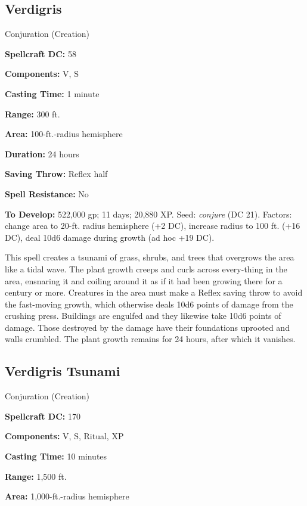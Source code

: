 \documentclass{article}
\begin{document}
\vspace{12pt}
\subsection*{Verdigris }

Conjuration (Creation) 

\textbf{Spellcraft DC:} 58 

\textbf{Components:} V, S 

\textbf{Casting Time:} 1 minute 

\textbf{Range:} 300 ft. 

\textbf{Area:} 100-ft.-radius hemisphere 

\textbf{Duration:} 24 hours 

\textbf{Saving Throw:} Reflex half 

\textbf{Spell Resistance:} No 

\textbf{To Develop:} 522,000 gp; 11 days; 20,880 XP. Seed: \textit{conjure }(DC 
21). Factors: change area to 20-ft. radius hemisphere (+2 DC), increase radius 
to 100 ft. (+16 DC), deal 10d6 damage during growth (ad hoc +19 DC). 

This spell creates a tsunami of grass, shrubs, and trees that overgrows the area 
like a tidal wave. The plant growth creeps and curls across every-thing in the 
area, ensnaring it and coiling around it as if it had been growing there for a 
century or more. Creatures in the area must make a Reflex saving throw to avoid 
the fast-moving growth, which otherwise deals 10d6 points of damage from the crushing 
press. Buildings are engulfed and they likewise take 10d6 points of damage. Those 
destroyed by the damage have their foundations uprooted and walls crumbled. The 
plant growth remains for 24 hours, after which it vanishes. 

\vspace{12pt}
\subsection*{Verdigris Tsunami }

Conjuration (Creation) 

\textbf{Spellcraft DC:} 170 

\textbf{Components:} V, S, Ritual, XP 

\textbf{Casting Time:} 10 minutes 

\textbf{Range:} 1,500 ft. 

\textbf{Area:} 1,000-ft.-radius hemisphere 
\end{document}
